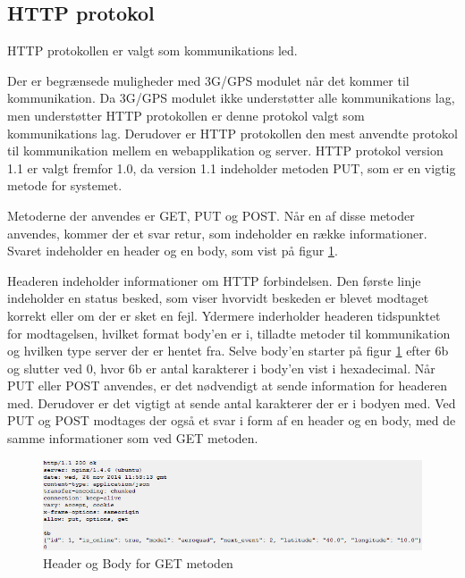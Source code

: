 \subsection{HTTP protokol}
HTTP protokollen er valgt som kommunikations led. 

Der er begrænsede muligheder med 3G/GPS modulet når det kommer til kommunikation. 
Da 3G/GPS modulet ikke understøtter alle kommunikations lag, men understøtter HTTP protokollen er denne protokol valgt som kommunikations lag.
Derudover er HTTP protokollen den mest anvendte protokol til kommunikation mellem en webapplikation og server.
HTTP protokol version 1.1 er valgt fremfor 1.0, da version 1.1 indeholder metoden PUT, som er en vigtig metode for systemet.

Metoderne der anvendes er GET, PUT og POST. Når en af disse metoder anvendes, kommer der et svar retur, som indeholder en række informationer.
Svaret indeholder en header og en body, som vist på figur \ref{fig:headerbodyget}. 

Headeren indeholder informationer om HTTP forbindelsen. Den første linje indeholder en status besked, som viser hvorvidt beskeden er blevet modtaget korrekt eller om der er sket en fejl. Ydermere inderholder headeren tidspunktet for modtagelsen, hvilket format body'en er i, tilladte metoder til kommunikation og hvilken type server der er hentet fra. Selve body'en starter på figur \ref{fig:headerbodyget} efter 6b og slutter ved 0, hvor 6b er antal karakterer i body'en vist i hexadecimal. Når PUT eller POST anvendes, er det nødvendigt at sende information for headeren med. Derudover er det vigtigt at sende antal karakterer der er i bodyen med. Ved PUT og POST modtages der også et svar i form af en header og en body, med de samme informationer som ved GET metoden. 
\begin{figure}[H]
	\centering
	\includegraphics[width=1\textwidth]{Billeder/header_body_get.png}
	\caption{Header og Body for GET metoden}
	\label{fig:headerbodyget}
\end{figure}